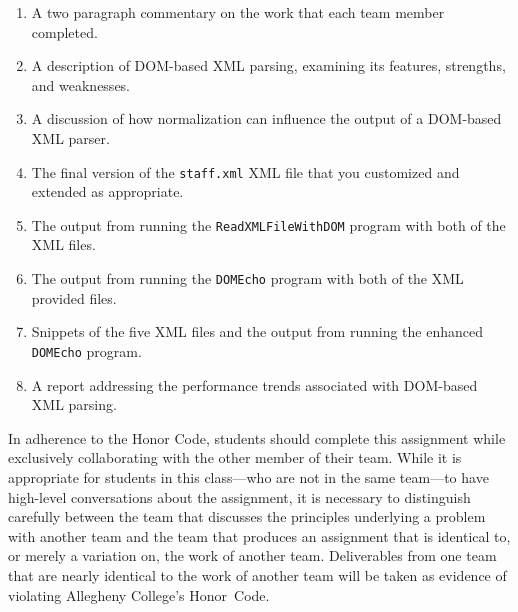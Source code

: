 \vspace*{-.1in}
\begin{enumerate}
  \setlength{\itemsep}{0pt}
  \item A two paragraph commentary on the work that each team member completed. 
  \item A description of DOM-based XML parsing, examining its features, strengths, and weaknesses.
  \item A discussion of how normalization can influence the output of a DOM-based XML parser.
  \item The final version of the {\tt staff.xml} XML file that you customized and extended as appropriate.
  \item The output from running the {\tt ReadXMLFileWithDOM} program with both of the XML files.
  \item The output from running the {\tt DOMEcho} program with both of the XML provided files.
  \item Snippets of the five XML files and the output from running the enhanced {\tt DOMEcho} program.
  \item A report addressing the performance trends associated with DOM-based XML parsing.
\end{enumerate}
\vspace*{-.1in}

In adherence to the Honor Code, students should complete this assignment while exclusively collaborating with the
other member of their team. While it is appropriate for students in this class---who are not in the same team---to have
high-level conversations about the assignment, it is necessary to distinguish carefully between the team that discusses
the principles underlying a problem with another team and the team that produces an assignment that is identical to, or
merely a variation on, the work of another team.  Deliverables from one team that are nearly identical to the work of
another team will be taken as evidence of violating Allegheny College's \mbox{Honor Code}.



